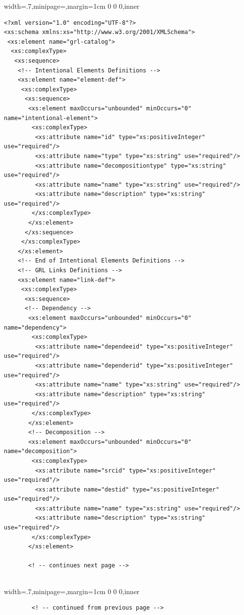 \documentclass[dissertation,final]{softeng}
\newenvironment{featurecode}[1]
{ \lrbox\featurebox \begin{adjustbox}{width=#1\textwidth,minipage=\textwidth,margin=1cm 0 0 0,inner} }
{ \end{adjustbox}\endlrbox}
\newenvironment{featurelist}[2]
{
\newcommand{\setcaption}{\caption{#1}}
\newcommand{\setlabel}{\label{#2}}
}
{\begin{listing}[h!]\centering\usebox\featurebox\setcaption\setlabel\end{listing}}
\begin{document}
\begin{appendices}
\begin{featurelist}{GRL Catalogue XSD Schema -- Part one}{lst:grl_catalogue_xsd_schema_one}
\begin{featurecode}{.7}
\begin{verbatim}
<?xml version="1.0" encoding="UTF-8"?>
<xs:schema xmlns:xs="http://www.w3.org/2001/XMLSchema">
 <xs:element name="grl-catalog">
  <xs:complexType>
   <xs:sequence>
    <!-- Intentional Elements Definitions -->
	<xs:element name="element-def">
	 <xs:complexType>
	  <xs:sequence>
	   <xs:element maxOccurs="unbounded" minOccurs="0" name="intentional-element">
	    <xs:complexType>
		 <xs:attribute name="id" type="xs:positiveInteger" use="required"/>
		 <xs:attribute name="type" type="xs:string" use="required"/>
		 <xs:attribute name="decompositiontype" type="xs:string" use="required"/>
		 <xs:attribute name="name" type="xs:string" use="required"/>
		 <xs:attribute name="description" type="xs:string" use="required"/>
		</xs:complexType>
	   </xs:element>
	  </xs:sequence>
     </xs:complexType>
    </xs:element>
    <!-- End of Intentional Elements Definitions -->
    <!-- GRL Links Definitions -->
    <xs:element name="link-def">
	 <xs:complexType>
	  <xs:sequence>
	  <!-- Dependency -->
	   <xs:element maxOccurs="unbounded" minOccurs="0" name="dependency">
	    <xs:complexType>
		 <xs:attribute name="dependeeid" type="xs:positiveInteger" use="required"/>
		 <xs:attribute name="dependerid" type="xs:positiveInteger" use="required"/>
		 <xs:attribute name="name" type="xs:string" use="required"/>
		 <xs:attribute name="description" type="xs:string" use="required"/>
		</xs:complexType>
	   </xs:element>
	   <!-- Decomposition -->
	   <xs:element maxOccurs="unbounded" minOccurs="0" name="decomposition">
	    <xs:complexType>
	     <xs:attribute name="srcid" type="xs:positiveInteger" use="required"/>
		 <xs:attribute name="destid" type="xs:positiveInteger" use="required"/>
		 <xs:attribute name="name" type="xs:string" use="required"/>
		 <xs:attribute name="description" type="xs:string" use="required"/>
		</xs:complexType>
	   </xs:element>

	   <! -- continues next page -->
        
\end{verbatim}
\end{featurecode}
\end{featurelist}
\clearpage
\begin{featurelist}{GRL Catalogue XSD Schema -- Part two}{lst:grl_catalogue_xsd_schema_two}
\begin{featurecode}{.7}
\begin{verbatim}
        <! -- continued from previous page -->
        

\end{verbatim}
\end{featurecode}
\end{featurelist}
\end{appendices}
\end{document}
